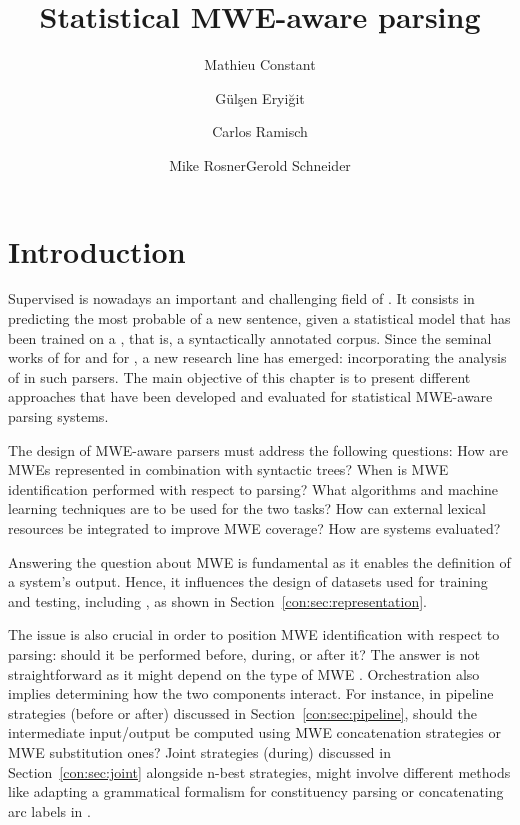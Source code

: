 \documentclass[output=paper]{langsci/langscibook}
\title{Statistical MWE-aware parsing}
\author{Mathieu Constant\affiliation{ATILF UMR 7118, Université de Lorraine/CNRS}\and Gülşen Eryiğit\affiliation{Istanbul Technical University}\and Carlos Ramisch\affiliation{Aix-Marseille Université}\and Mike Rosner\affiliation{University of Malta}\lastand Gerold Schneider\affiliation{University of Konstanz and University of Zurich}}
\begin{document}
\maketitle

%
\section{Introduction}

Supervised  is nowadays an important and challenging field of . 
It consists in predicting the most probable  of a new sentence, given a statistical model that has been trained on a , that is, a syntactically annotated corpus.
Since the seminal works of \citet{nivre04b} for  and \citet{arun05} for , a new research line has emerged: incorporating the analysis of  in such parsers.
The main objective of this chapter is to present different approaches that have been developed and evaluated for statistical MWE-aware parsing systems. 


The design of MWE-aware parsers must address the following questions:
How are MWEs represented in combination with syntactic trees? 
When is MWE identification performed with respect to parsing? 
What algorithms and machine learning techniques are to be used for the two tasks? 
How can external lexical resources be integrated to improve MWE coverage? 
How are systems evaluated?


Answering the question about MWE  is fundamental as it enables the definition of a system's output. Hence, it influences the design of datasets used for training and testing, including , as shown in Section~\ref{con:sec:representation}.

The  issue is also crucial in order to position MWE identification with respect to parsing: should it be performed before, during, or after it? The answer is not straightforward as it might depend on the type of MWE \citep{eryigit:2011:multiword}. Orchestration also implies determining how the two components interact. 
For instance, in pipeline strategies (before or after) discussed in Section~\ref{con:sec:pipeline}, should the intermediate input/output be computed using MWE concatenation strategies or MWE substitution ones? 
Joint strategies (during)  discussed in Section~\ref{con:sec:joint} alongside n-best strategies, might involve different methods like adapting a grammatical formalism for constituency parsing \citep{green13} or concatenating arc labels in  \citep{vincze13}.
\end{document}
